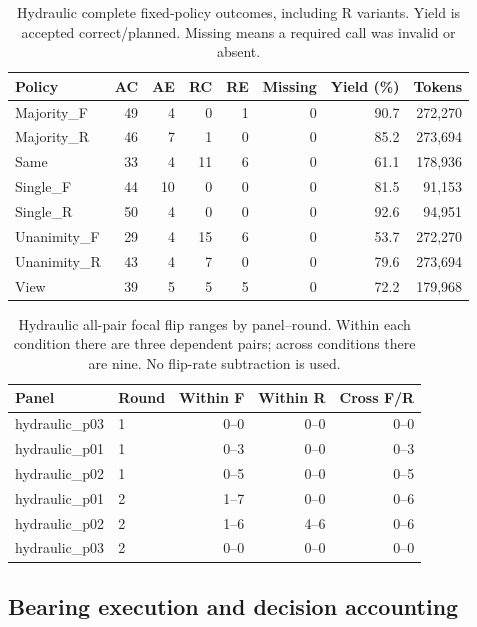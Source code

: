 \documentclass[11pt,a4paper]{article}
\begin{document}
\begin{table}[htbp]\centering\small
\caption{Hydraulic complete fixed-policy outcomes, including R variants. Yield is accepted correct/planned. Missing means a required call was invalid or absent.}
\label{tab:policy_full_hydraulic}
\begin{tabular}{@{}lrrrrrrr@{}}\toprule
Policy & AC & AE & RC & RE & Missing & Yield (\%) & Tokens \\\midrule
Majority\_F & 49 & 4 & 0 & 1 & 0 & 90.7 & 272,270 \\
Majority\_R & 46 & 7 & 1 & 0 & 0 & 85.2 & 273,694 \\
Same & 33 & 4 & 11 & 6 & 0 & 61.1 & 178,936 \\
Single\_F & 44 & 10 & 0 & 0 & 0 & 81.5 & 91,153 \\
Single\_R & 50 & 4 & 0 & 0 & 0 & 92.6 & 94,951 \\
Unanimity\_F & 29 & 4 & 15 & 6 & 0 & 53.7 & 272,270 \\
Unanimity\_R & 43 & 4 & 7 & 0 & 0 & 79.6 & 273,694 \\
View & 39 & 5 & 5 & 5 & 0 & 72.2 & 179,968 \\
\bottomrule\end{tabular}\end{table}

\begin{table}[htbp]\centering\small
\caption{Hydraulic all-pair focal flip ranges by panel--round. Within each condition there are three dependent pairs; across conditions there are nine. No flip-rate subtraction is used.}
\label{tab:policy_flips_hydraulic}
\begin{tabular}{@{}llrrr@{}}\toprule
Panel & Round & Within F & Within R & Cross F/R \\\midrule
hydraulic\_p03 & 1 & 0--0 & 0--0 & 0--0 \\
hydraulic\_p01 & 1 & 0--3 & 0--0 & 0--3 \\
hydraulic\_p02 & 1 & 0--5 & 0--0 & 0--5 \\
hydraulic\_p01 & 2 & 1--7 & 0--0 & 0--6 \\
hydraulic\_p02 & 2 & 1--6 & 4--6 & 0--6 \\
hydraulic\_p03 & 2 & 0--0 & 0--0 & 0--0 \\
\bottomrule\end{tabular}\end{table}

\FloatBarrier

\subsection{Bearing execution and decision accounting}
\end{document}
